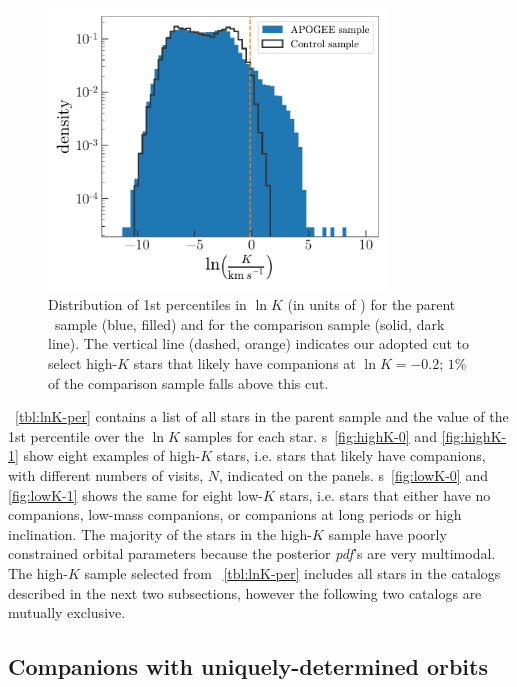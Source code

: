 \documentclass[modern, letterpaper]{aastex62}
\newcommand{\apogee}{\project{\acronym{APOGEE}}}
\newcommand{\pdf}{\textit{pdf}}
\newcommand{\lnKcut}{-0.2}
\begin{document}
\begin{figure}[h]
\begin{center}
\includegraphics[width=0.8\textwidth]{lnK-percentiles}
\end{center}
\caption{%
Distribution of 1st percentiles in $\ln K$ (in units of \kms) for the parent
\apogee\ sample (blue, filled) and for the comparison sample (solid, dark line).
The vertical line (dashed, orange) indicates our adopted cut to select high-$K$
stars that likely have companions at $\ln K = \lnKcut$; $1\%$ of the comparison
sample falls above this cut.
\label{fig:lnK-percentiles}
}
\end{figure}

\tablename~\ref{tbl:lnK-per} contains a list of all stars in the parent sample
and the value of the 1st percentile over the $\ln K$ samples for each star.
\figurename s~\ref{fig:highK-0} and \ref{fig:highK-1} show eight examples of
high-$K$ stars, i.e. stars that likely have companions, with different numbers
of visits, $N$, indicated on the panels.
\figurename s~\ref{fig:lowK-0} and \ref{fig:lowK-1} shows the same for eight
low-$K$ stars, i.e. stars that either have no companions, low-mass companions,
or companions at long periods or high inclination.
The majority of the stars in the high-$K$ sample have poorly constrained orbital
parameters because the posterior \pdf 's are very multimodal.
The high-$K$ sample selected from \tablename~\ref{tbl:lnK-per} includes all
stars in the catalogs described in the next two subsections, however the
following two catalogs are mutually exclusive.


\subsection{Companions with uniquely-determined orbits}
\label{sec:catalog-unimodal}
\end{document}
